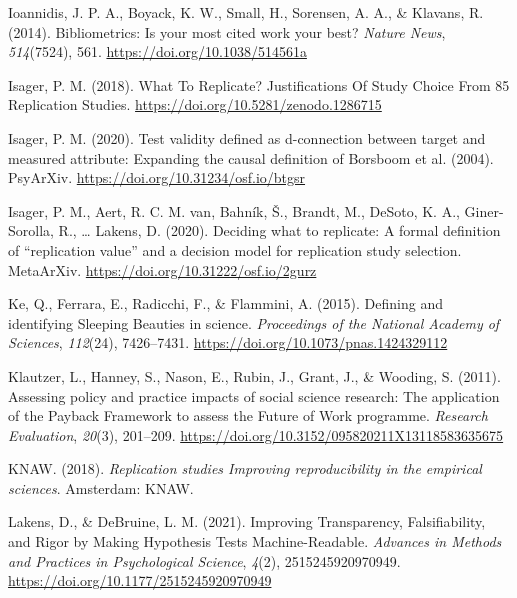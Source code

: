 \documentclass[
  english,
  jou,floatsintext]{apa6}
\newlength{\cslhangindent}
\newlength{\cslentryspacingunit} %
\newenvironment{CSLReferences}[2] %
 {%
  \setlength{\parindent}{0pt}
  \ifodd #1
  \let\oldpar\par
  \def\par{\hangindent=\cslhangindent\oldpar}
  \fi
  \setlength{\parskip}{#2\cslentryspacingunit}
 }%
 {}
\begin{document}
\begin{CSLReferences}{1}{0}
\leavevmode{}%
Ioannidis, J. P. A., Boyack, K. W., Small, H., Sorensen, A. A., \& Klavans, R. (2014). Bibliometrics: {Is} your most cited work your best? \emph{Nature News}, \emph{514}(7524), 561. \url{https://doi.org/10.1038/514561a}

\leavevmode{}%
Isager, P. M. (2018). What {To Replicate}? {Justifications Of Study Choice From} 85 {Replication Studies}. \url{https://doi.org/10.5281/zenodo.1286715}

\leavevmode{}%
Isager, P. M. (2020). Test validity defined as d-connection between target and measured attribute: {Expanding} the causal definition of {Borsboom} et al. (2004). {PsyArXiv}. \url{https://doi.org/10.31234/osf.io/btgsr}

\leavevmode{}%
Isager, P. M., Aert, R. C. M. van, Bahník, Š., Brandt, M., DeSoto, K. A., Giner-Sorolla, R., \ldots{} Lakens, D. (2020). Deciding what to replicate: {A} formal definition of {``replication value''} and a decision model for replication study selection. {MetaArXiv}. \url{https://doi.org/10.31222/osf.io/2gurz}

\leavevmode{}%
Ke, Q., Ferrara, E., Radicchi, F., \& Flammini, A. (2015). Defining and identifying {Sleeping Beauties} in science. \emph{Proceedings of the National Academy of Sciences}, \emph{112}(24), 7426--7431. \url{https://doi.org/10.1073/pnas.1424329112}

\leavevmode{}%
Klautzer, L., Hanney, S., Nason, E., Rubin, J., Grant, J., \& Wooding, S. (2011). Assessing policy and practice impacts of social science research: The application of the {Payback Framework} to assess the {Future} of {Work} programme. \emph{Research Evaluation}, \emph{20}(3), 201--209. \url{https://doi.org/10.3152/095820211X13118583635675}

\leavevmode{}%
KNAW. (2018). \emph{Replication studies \textendash{} {Improving} reproducibility in the empirical sciences}. {Amsterdam}: {KNAW}.

\leavevmode{}%
Lakens, D., \& DeBruine, L. M. (2021). Improving {Transparency}, {Falsifiability}, and {Rigor} by {Making Hypothesis Tests Machine}-{Readable}. \emph{Advances in Methods and Practices in Psychological Science}, \emph{4}(2), 2515245920970949. \url{https://doi.org/10.1177/2515245920970949}


\end{CSLReferences}
\end{document}
